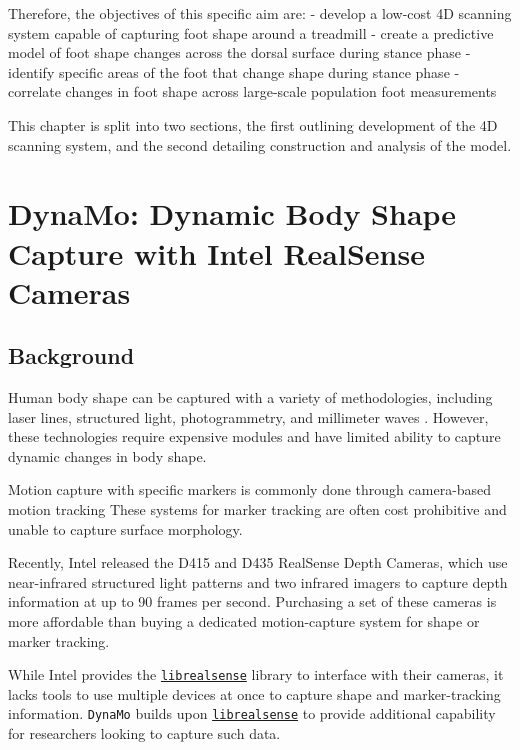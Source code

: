 \documentclass[defaultstyle,11pt]{comps}
\begin{document}
Therefore, the objectives of this specific aim are:
- develop a low-cost 4D scanning system capable of capturing foot shape around a treadmill
- create a predictive model of foot shape changes across the dorsal surface during stance phase
- identify specific areas of the foot that change shape during stance phase
- correlate changes in foot shape across large-scale population foot measurements

This chapter is split into two sections, the first outlining development of the 4D scanning system, and the second detailing construction and analysis of the model.

\hypertarget{dynamo-dynamic-body-shape-capture-with-intel-realsense-cameras}{%
\section{DynaMo: Dynamic Body Shape Capture with Intel RealSense Cameras}\label{dynamo-dynamic-body-shape-capture-with-intel-realsense-cameras}}

\hypertarget{background-1}{%
\subsection{Background}\label{background-1}}

Human body shape can be captured with a variety of methodologies, including laser lines, structured light, photogrammetry, and millimeter waves \citep{Daanen2013}.
However, these technologies require expensive modules and have limited ability to capture dynamic changes in body shape.

Motion capture with specific markers is commonly done through camera-based motion tracking \citep{Windolf2008}
These systems for marker tracking are often cost prohibitive and unable to capture surface morphology.

Recently, Intel released the D415 and D435 RealSense Depth Cameras, which use near-infrared structured light patterns and two infrared imagers to capture depth information at up to 90 frames per second.
Purchasing a set of these cameras is more affordable than buying a dedicated motion-capture system for shape or marker tracking.

While Intel provides the \href{https://github.com/IntelRealSense/librealsense}{\texttt{librealsense}} library to interface with their cameras, it lacks tools to use multiple devices at once to capture shape and marker-tracking information.
\texttt{DynaMo} builds upon \href{https://github.com/IntelRealSense/librealsense}{\texttt{librealsense}} to provide additional capability for researchers looking to capture such data.
\end{document}
